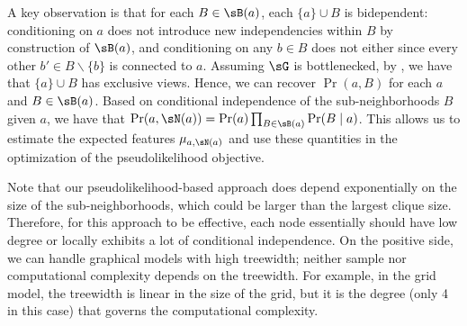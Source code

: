 A key observation is that for each $B \in \sB(a)$, each $\{a\} \cup B$ is bidependent:
conditioning on $a$ does not introduce new independencies within $B$ by construction of $\sB(a)$,
and conditioning on any $b \in B$ does not either since every other $b' \in B \backslash \{b\}$
is connected to $a$.
Assuming $\sG$ is bottlenecked, by ,
we have that $\{a\} \cup B$ has exclusive views.
Hence, we can recover $\Pr(a,B)$ for each $a$ and $B \in \sB(a)$.
Based on conditional independence of the sub-neighborhoods $B$ given $a$,
we have that $\Pr(a, \sN(a)) = \Pr(a) \prod_{B \in \sB(a)} \Pr(B \mid a)$.
This allows us to estimate the expected features $\mu_{a,\sN(a)}$ and use these quantities
in the optimization of the pseudolikelihood objective.


Note that our pseudolikelihood-based approach
does depend exponentially on the size of the sub-neighborhoods,
which could be larger than the largest clique size.
Therefore,
for this approach to be effective,
each node essentially should have low degree or locally exhibits a lot of
conditional independence.
On the positive side, we can handle graphical models with high treewidth;
neither sample nor computational complexity depends on the treewidth.
For example, in the grid model, the treewidth is linear in the size of the grid,
but it is the degree (only 4 in this case) that governs the computational complexity.
